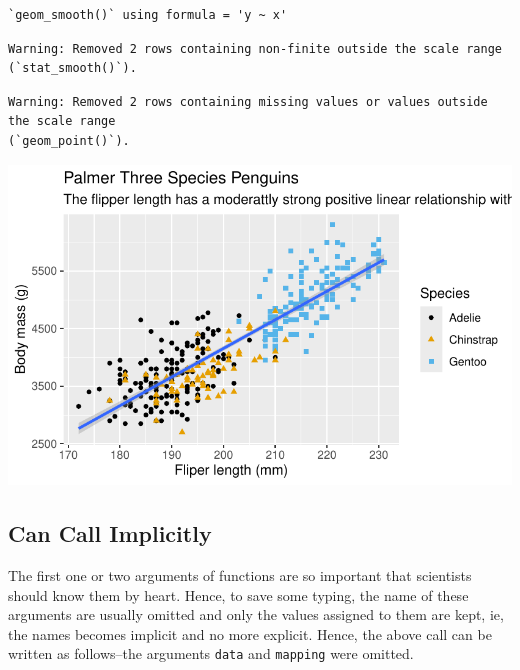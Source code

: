 \documentclass[
  letterpaper,
  DIV=11,
  numbers=noendperiod]{scrreprt}
\begin{document}
\begin{verbatim}
`geom_smooth()` using formula = 'y ~ x'
\end{verbatim}

\begin{verbatim}
Warning: Removed 2 rows containing non-finite outside the scale range
(`stat_smooth()`).
\end{verbatim}

\begin{verbatim}
Warning: Removed 2 rows containing missing values or values outside the scale range
(`geom_point()`).
\end{verbatim}

\includegraphics{src/r-for-data-science/01-data-viz_files/figure-pdf/unnamed-chunk-16-1.pdf}

\subsection{Can Call Implicitly}\label{can-call-implicitly}

The first one or two arguments of functions are so important that
scientists should know them by heart. Hence, to save some typing, the
name of these arguments are usually omitted and only the values assigned
to them are kept, ie, the names becomes implicit and no more explicit.
Hence, the above call can be written as follows--the arguments
\texttt{data} and \texttt{mapping} were omitted.
\end{document}
